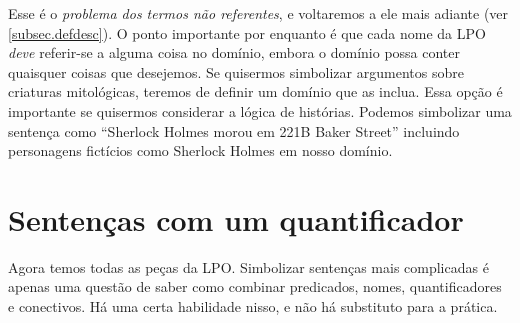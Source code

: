 Esse é o \emph{problema dos termos não referentes}, e voltaremos a ele mais adiante (ver \cref{subsec.defdesc}). O ponto importante por enquanto é que cada nome da LPO \emph{deve} referir-se a alguma coisa no domínio, embora o domínio possa conter quaisquer coisas que desejemos. Se quisermos simbolizar argumentos sobre criaturas mitológicas, teremos de definir um domínio que as inclua. Essa opção é importante se quisermos considerar a lógica de histórias. Podemos simbolizar uma sentença como \textquotedblleft Sherlock Holmes morou em 221B Baker Street\textquotedblright{} incluindo personagens fictícios como Sherlock Holmes em nosso domínio.

\chapter{Sentenças com um quantificador}
\label{s:MoreMonadic}

Agora temos todas as peças da LPO. Simbolizar sentenças mais complicadas é apenas uma questão de saber como combinar predicados, nomes, quantificadores e conectivos. Há uma certa habilidade nisso, e não há substituto para a prática.

